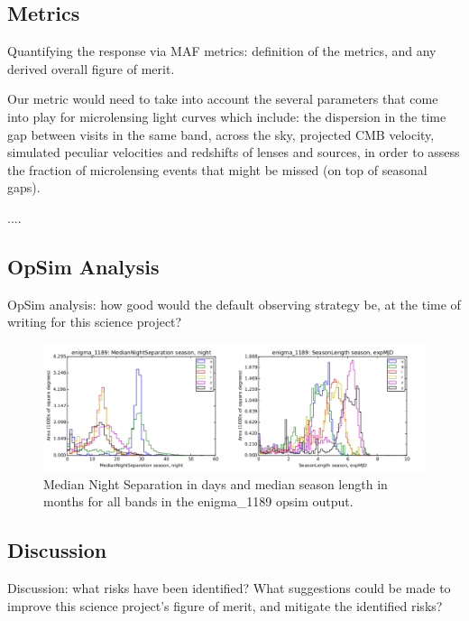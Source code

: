 \subsection{Metrics}
\label{sec:\secname:metrics}

Quantifying the response via MAF metrics: definition of the metrics,
and any derived overall figure of merit.

Our metric would need to take into account the several parameters that come into play for microlensing light curves which include: the dispersion in the time gap
between visits in the same band, across the sky, projected CMB velocity, simulated peculiar velocities and redshifts of lenses and sources, in order to assess
the fraction of microlensing events that might be missed (on top of
seasonal gaps).

....



\subsection{OpSim Analysis}
\label{sec:\secname:analysis}

OpSim analysis: how good would the default observing strategy be, at
the time of writing for this science project?

\begin{center}
\begin{figure}
\includegraphics[width=\textwidth]{figs/agn/enigma_1189_NightSep_seasonLength.pdf}
\caption{Median Night Separation in days and median season length in months for all bands in the enigma\_1189 opsim output.}
\label{microfig}
\end{figure}
\end{center}


\subsection{Discussion}
\label{sec:\secname:discussion}

Discussion: what risks have been identified? What suggestions could be
made to improve this science project's figure of merit, and mitigate
the identified risks?



\navigationbar
